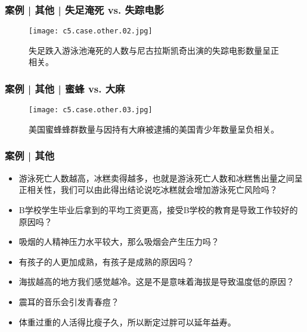 \begin{frame}
  \frametitle{案例 | 其他 | 失足淹死 vs. 失踪电影}
  \begin{figure}
    \centering
    \texttt{[image: c5.case.other.02.jpg]}
    \caption{失足跌入游泳池淹死的人数与尼古拉斯凯奇出演的失踪电影数量呈正相关。}
  \end{figure}
\end{frame}

\begin{frame}
  \frametitle{案例 | 其他 | 蜜蜂 vs. 大麻}
  \begin{figure}
    \centering
    \texttt{[image: c5.case.other.03.jpg]}
    \caption{美国蜜蜂蜂群数量与因持有大麻被逮捕的美国青少年数量呈负相关。}
  \end{figure}
\end{frame}


\begin{frame}
  \frametitle{案例 | 其他}
  \begin{itemize}
    \item 游泳死亡人数越高，冰糕卖得越多，也就是游泳死亡人数和冰糕售出量之间呈正相关性，我们可以由此得出结论说吃冰糕就会增加游泳死亡风险吗？
    \item B学校学生毕业后拿到的平均工资更高，接受B学校的教育是导致工作较好的原因吗？
    \item 吸烟的人精神压力水平较大，那么吸烟会产生压力吗？
    \item 有孩子的人更加成熟，有孩子是成熟的原因吗？
    \item 海拔越高的地方我们感觉越冷。这是不是意味着海拔是导致温度低的原因？
    \item 震耳的音乐会引发青春痘？
    \item 体重过重的人活得比瘦子久，所以断定过胖可以延年益寿。
  \end{itemize}
\end{frame}


